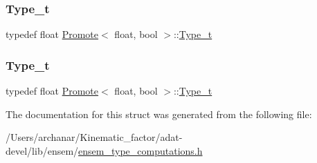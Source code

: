 \subsubsection{\texorpdfstring{Type\_t}{Type\_t}\hspace{0.1cm}{\footnotesize\ttfamily [2/3]}}
{\footnotesize\ttfamily typedef float \mbox{\hyperlink{structPromote}{Promote}}$<$ float, bool $>$\+::\mbox{\hyperlink{structPromote_3_01float_00_01bool_01_4_a4a81b15631e324d8d2dade1c48484b63}{Type\+\_\+t}}}

\mbox{\label{structPromote_3_01float_00_01bool_01_4_a4a81b15631e324d8d2dade1c48484b63}} 
\subsubsection{\texorpdfstring{Type\_t}{Type\_t}\hspace{0.1cm}{\footnotesize\ttfamily [3/3]}}
{\footnotesize\ttfamily typedef float \mbox{\hyperlink{structPromote}{Promote}}$<$ float, bool $>$\+::\mbox{\hyperlink{structPromote_3_01float_00_01bool_01_4_a4a81b15631e324d8d2dade1c48484b63}{Type\+\_\+t}}}



The documentation for this struct was generated from the following file\+:\begin{DoxyCompactItemize}
\item 
/\+Users/archanar/\+Kinematic\+\_\+factor/adat-\/devel/lib/ensem/\mbox{\hyperlink{adat-devel_2lib_2ensem_2ensem__type__computations_8h}{ensem\+\_\+type\+\_\+computations.\+h}}\end{DoxyCompactItemize}
